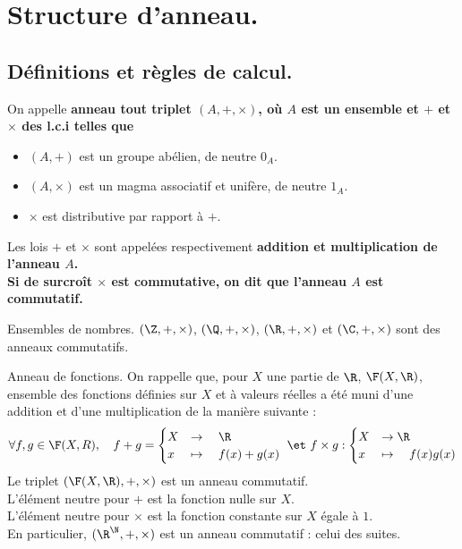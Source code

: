 \documentclass[11pt]{article}
\begin{document}
\section{Structure d'anneau.}

\subsection{Définitions et règles de calcul.}

\begin{defi}{}{}
    On appelle \bf{anneau} tout triplet $(A,+,\times)$, où $A$ est un ensemble et $+$ et $\times$ des l.c.i telles que
    \begin{itemize}
        \item $(A,+)$ est un groupe abélien, de neutre $0_A$.
        \item $(A,\times)$ est un magma associatif et unifère, de neutre $1_A$.
        \item $\times$ est distributive par rapport à $+$.
    \end{itemize}
    Les lois $+$ et $\times$ sont appelées respectivement \bf{addition} et \bf{multiplication} de l'anneau $A$.\\
    Si de surcroît $\times$ est commutative, on dit que l'anneau $A$ est commutatif.
\end{defi}

\begin{ex}{Ensembles de nombres.}{}
    $(\Z,+,\times)$, $(\Q,+,\times)$, $(\R,+,\times)$ et $(\C,+,\times)$ sont des anneaux commutatifs.
\end{ex}

\begin{ex}{Anneau de fonctions.}{}
    On rappelle que, pour $X$ une partie de $\R$, $\F(X,\R)$, ensemble des fonctions définies sur $X$ et à valeurs réelles a été muni d'une addition et d'une multiplication de la manière suivante :
    \begin{equation*}
        \forall f,g\in\F(X,R), \quad f+g=\begin{cases}
            X&\to\quad \R\\x&\mapsto\quad f(x)+g(x)
        \end{cases} ~\et~ f\times g : \begin{cases}
            X &\to \R\\
            x &\mapsto \quad f(x)g(x)
        \end{cases}
    \end{equation*}
    Le triplet $(\F(X,\R), +, \times)$ est un anneau commutatif.\\
    L'élément neutre pour $+$ est la fonction nulle sur $X$.\\
    L'élément neutre pour $\times$ est la fonction constante sur $X$ égale à $1$.\\
    En particulier, $(\R^\N,+,\times)$ est un anneau commutatif : celui des suites.
\end{ex}
\end{document}
